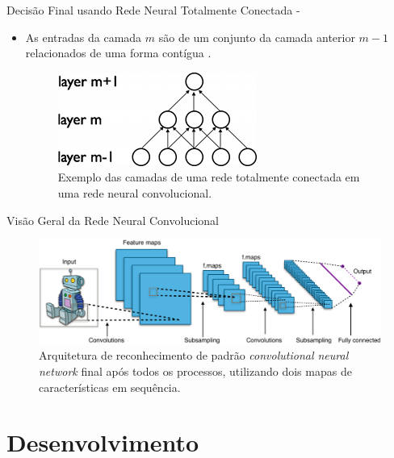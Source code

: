 \documentclass[aspectratio=169, xcolor=dvipsnames]{beamer}
\let\olditem=\item%
\renewcommand{\item}{\olditem \justifying}
\begin{document}
		\begin{frame}[allowframebreaks]{Decisão Final usando Rede Neural Totalmente Conectada -}
			\begin{itemize}
				\setlength\itemsep{2em}
				\item As entradas da camada $ m $ são de um conjunto da camada anterior $ m-1 $ relacionados de uma forma contígua \cite{LeCun1998G}.
				
				\bigskip

					\begin{figure}[H]
						\centering
						\includegraphics[width=0.6\linewidth]{img/layers_cnn.png}
						\caption{Exemplo das camadas de uma rede totalmente conectada em uma rede neural convolucional.}
						\label{fig:layers_cnn}
					\end{figure}
			\end{itemize}
		\end{frame}
	
		\begin{frame}{Visão Geral da Rede Neural Convolucional}
			\begin{figure}[h]
				\centering
				\includegraphics[width=1.0\linewidth]{img/visao_geral_convolucao.png}
				\caption{Arquitetura de reconhecimento de padrão \textit{convolutional neural network} final após todos os processos, utilizando dois mapas de características em sequência.}
				\label{fig:convolucao_teoria}
			\end{figure}
		\end{frame}


\section{Desenvolvimento} \label{sec:desenvolvimento}
\end{document}
